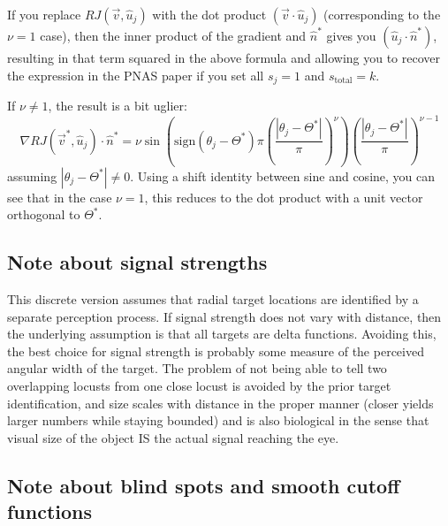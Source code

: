 \documentclass[12pt]{article}
\begin{document}
If you replace $RJ(\vec{v},\hat{u}_j)$ with the dot product $(\vec{v}\cdot\hat{u}_j)$ (corresponding to the $\nu=1$ case), then the inner product of the gradient and $\hat{n}^*$ gives you $(\hat{u}_j\cdot\hat{n}^*)$, resulting in that term squared in the above formula and allowing you to recover the expression in the PNAS paper if you set all $s_j=1$ and $s_{\text{total}}=k$.

If $\nu\neq 1$, the result is a bit uglier:
\[
\nabla RJ(\vec{v}^*,\hat{u}_j)\cdot\hat{n}^* = \nu\sin\left(\text{sign}(\theta_j-\Theta^*)\pi\left(\frac{|\theta_j-\Theta^*|}{\pi}\right)^\nu\right)\left(\frac{|\theta_j-\Theta^*|}{\pi}\right)^{\nu-1}
\]
assuming $|\theta_j-\Theta^*|\neq 0$. Using a shift identity between sine and cosine, you can see that in the case $\nu=1$, this reduces to the dot product with a unit vector orthogonal to $\Theta^*$.

\subsection*{Note about signal strengths}
This discrete version assumes that radial target locations are identified by a separate perception process. If signal strength does not vary with distance, then the underlying assumption is that all targets are delta functions. Avoiding this, the best choice for signal strength is probably some measure of the perceived angular width of the target. The problem of not being able to tell two overlapping locusts from one close locust is avoided by the prior target identification, and size scales with distance in the proper manner (closer yields larger numbers while staying bounded) and is also biological in the sense that visual size of the object IS the actual signal reaching the eye.

\subsection*{Note about blind spots and smooth cutoff functions}
\end{document}
